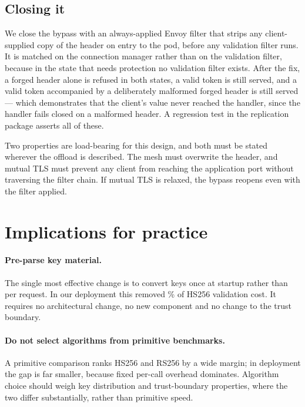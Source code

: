 \documentclass[pdflatex,sn-basic,twocolumn]{sn-jnl}
\begin{document}
\subsection{Closing it}

We close the bypass with an always-applied Envoy filter that strips any
client-supplied copy of the header on entry to the pod, before any validation
filter runs. It is matched on the connection manager rather than on the
validation filter, because in the state that needs protection no validation
filter exists. After the fix, a forged header alone is refused in both states,
a valid token is still served, and a valid token accompanied by a deliberately
malformed forged header is still served --- which demonstrates that the client's
value never reached the handler, since the handler fails closed on a malformed
header. A regression test in the replication package asserts all of these.

Two properties are load-bearing for this design, and both must be stated
wherever the offload is described. The mesh must overwrite the header, and
mutual TLS must prevent any client from reaching the application port without
traversing the filter chain. If mutual TLS is relaxed, the bypass reopens even
with the filter applied.

\section{Implications for practice}\label{sec:implications}

\paragraph{Pre-parse key material.} The single most effective change is to
convert keys once at startup rather than per request. In our deployment this
removed \KfHsConvPct\% of HS256 validation cost. It requires no architectural
change, no new component and no change to the trust boundary.

\paragraph{Do not select algorithms from primitive benchmarks.} A primitive
comparison ranks HS256 and RS256 by a wide margin; in deployment the gap is far
smaller, because fixed per-call overhead dominates. Algorithm choice should
weigh key distribution and trust-boundary properties, where the two differ
substantially, rather than primitive speed.
\end{document}
